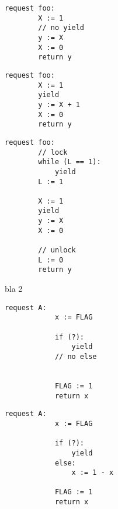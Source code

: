\noindent
\begin{minipage}[t]{0.45\textwidth}
	\begin{minipage}[t]{\textwidth}
		\begin{lstlisting}[caption={Without yield or lock (serializable)}]
    request foo: 
        X := 1 
        // no yield
        y := X 
        X := 0
        return y 
		\end{lstlisting}
	\end{minipage}
	\vspace{1em}
	\begin{minipage}[t]{\textwidth}
		\begin{lstlisting}[caption={With yield (not serializable)}]
    request foo: 
        X := 1 
        yield 
        y := X + 1
        X := 0
        return y 	
		\end{lstlisting}
	\end{minipage}
\end{minipage}%
\hfill
\begin{minipage}[t]{0.45\textwidth}
	\begin{lstlisting}[caption={With yield and lock (serializable)}]
    request foo: 
        // lock
        while (L == 1): 
            yield
        L := 1 

        X := 1
        yield
        y := X 
        X := 0

        // unlock    
        L := 0
        return y 
	\end{lstlisting}
\end{minipage}

\vspace{2em}
bla 2

\noindent
\begin{minipage}[t]{0.45\textwidth}
	\begin{lstlisting}[caption={Not serializable: {(A,0),(A,0)}}]
		request A: 
		    x := FLAG 
		
		    if (?): 
		        yield
		    // no else
		
		
		    FLAG := 1 
		    return x
	\end{lstlisting}
\end{minipage}%
\hfill
\begin{minipage}[t]{0.45\textwidth}
	\begin{lstlisting}[caption={Serializable}]
		request A: 
		    x := FLAG
		
		    if (?):
		        yield
		    else:
		        x := 1 - x
		
		    FLAG := 1
		    return x
	\end{lstlisting}
\end{minipage}

